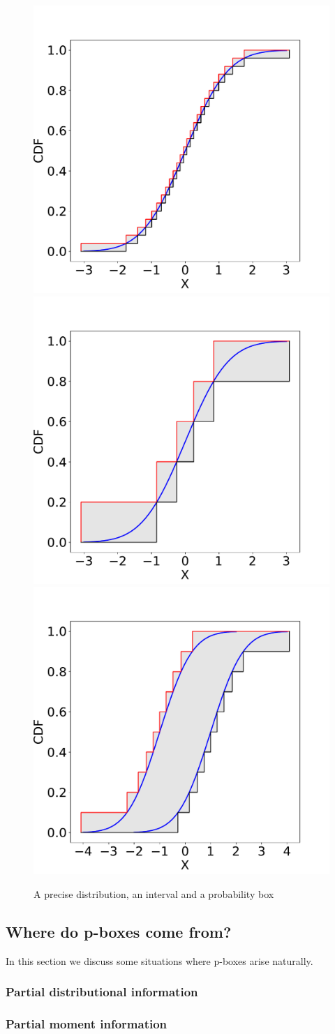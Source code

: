 \documentclass{juliacon}
\begin{document}
\begin{figure}[htp]

  \centering
  \includegraphics[width=.3\textwidth]{../examples/JuliaCon/fig2/fig2_pbox1.pdf}\hfill
  \includegraphics[width=.3\textwidth]{../examples/JuliaCon/fig2/fig2_pbox2.pdf}\hfill
  \includegraphics[width=.3\textwidth]{../examples/JuliaCon/fig2/fig2_pbox3.pdf}
  
  \caption{A precise distribution, an interval and a probability box}
  \label{fig:figure2}
  
\end{figure}


\subsection{Where do p-boxes come from?}

In this section we discuss some situations where p-boxes arise naturally.


\subsubsection{Partial distributional information} %



\subsubsection{Partial moment information} %
\label{section:Moments}
\end{document}
